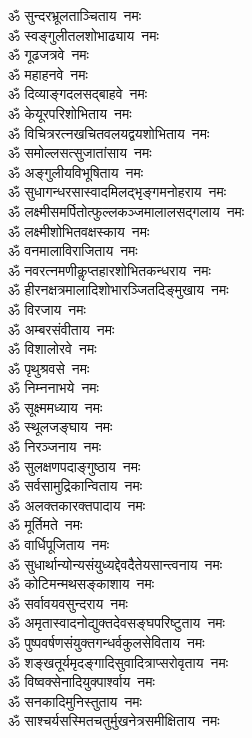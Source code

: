 \begin{multicols}{2}
\begin{flushleft}
ॐ सुन्दरभ्रूलताञ्चिताय~नमः\\
ॐ स्वङ्गुलीतलशोभाढ्याय~नमः\\
ॐ गूढजत्रवे~नमः\hfill{}\\
ॐ महाहनवे~नमः\\
ॐ दिव्याङ्गदलसद्बाहवे~नमः\\
ॐ केयूरपरिशोभिताय~नमः\\
ॐ विचित्ररत्नखचितवलयद्वय\-शोभिताय~नमः\\
ॐ समोल्लसत्सुजातांसाय~नमः\\
ॐ अङ्गुलीयविभूषिताय~नमः\\
ॐ सुधागन्धरसास्वादमिलद्भृङ्ग\-मनोहराय~नमः\\
ॐ लक्ष्मीसमर्पितोत्फुल्ल\-कञ्जमालालसद्गलाय~नमः\\
ॐ लक्ष्मीशोभितवक्षस्काय~नमः\\
ॐ वनमालाविराजिताय~नमः\hfill{}\\
ॐ नवरत्नमणीकॢप्तहारशोभित\-कन्धराय~नमः\\
ॐ हीरनक्षत्रमालादिशोभारञ्जित\-दिङ्मुखाय~नमः\\
ॐ विरजाय~नमः\\
ॐ अम्बरसंवीताय~नमः\\
ॐ विशालोरवे~नमः\\
ॐ पृथुश्रवसे~नमः\\
ॐ निम्ननाभये~नमः\\
ॐ सूक्ष्ममध्याय~नमः\\
ॐ स्थूलजङ्घाय~नमः\\
ॐ निरञ्जनाय~नमः\hfill{}\\
ॐ सुलक्षणपदाङ्गुष्ठाय~नमः\\
ॐ सर्वसामुद्रिकान्विताय~नमः\\
ॐ अलक्तकारक्तपादाय~नमः\\
ॐ मूर्तिमते~नमः\\
ॐ वार्धिपूजिताय~नमः\\
ॐ सुधार्थान्योन्यसंयुध्यद्देवदैतेय\-सान्त्वनाय~नमः\\
ॐ कोटिमन्मथसङ्काशाय~नमः\\
ॐ सर्वावयवसुन्दराय~नमः\\
ॐ अमृतास्वादनोद्युक्तदेवसङ्घ\-परिष्टुताय~नमः\\
ॐ पुष्पवर्षणसंयुक्तगन्धर्वकुल\-सेविताय~नमः\hfill{}\\
ॐ शङ्खतूर्यमृदङ्गादि\-सुवादित्राप्सरोवृताय~नमः\\
ॐ विष्वक्सेनादियुक्पार्श्वाय~नमः\\
ॐ सनकादिमुनिस्तुताय~नमः\\
ॐ साश्चर्यसस्मितचतुर्मुखनेत्र\-समीक्षिताय~नमः\\

\end{flushleft}
\end{multicols}
